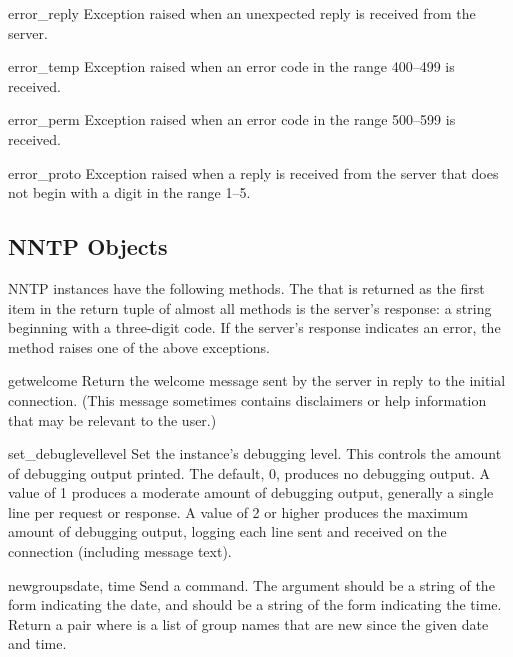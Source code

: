 \begin{excdesc}{error_reply}
Exception raised when an unexpected reply is received from the server.
\end{excdesc}

\begin{excdesc}{error_temp}
Exception raised when an error code in the range 400--499 is received.
\end{excdesc}

\begin{excdesc}{error_perm}
Exception raised when an error code in the range 500--599 is received.
\end{excdesc}

\begin{excdesc}{error_proto}
Exception raised when a reply is received from the server that does
not begin with a digit in the range 1--5.
\end{excdesc}

\subsection{NNTP Objects}

NNTP instances have the following methods.  The  that is
returned as the first item in the return tuple of almost all methods
is the server's response: a string beginning with a three-digit code.
If the server's response indicates an error, the method raises one of
the above exceptions.

\renewcommand{\indexsubitem}{(NNTP object method)}

\begin{funcdesc}{getwelcome}{}
Return the welcome message sent by the server in reply to the initial
connection.  (This message sometimes contains disclaimers or help
information that may be relevant to the user.)
\end{funcdesc}

\begin{funcdesc}{set_debuglevel}{level}
Set the instance's debugging level.  This controls the amount of
debugging output printed.  The default, 0, produces no debugging
output.  A value of 1 produces a moderate amount of debugging output,
generally a single line per request or response.  A value of 2 or
higher produces the maximum amount of debugging output, logging each
line sent and received on the connection (including message text).
\end{funcdesc}

\begin{funcdesc}{newgroups}{date, time}
Send a  command.  The  argument should be a
string of the form  indicating the
date, and  should be a string of the form
 indicating the time.  Return a pair
 where  is a list of
group names that are new since the given date and time.
\end{funcdesc}

